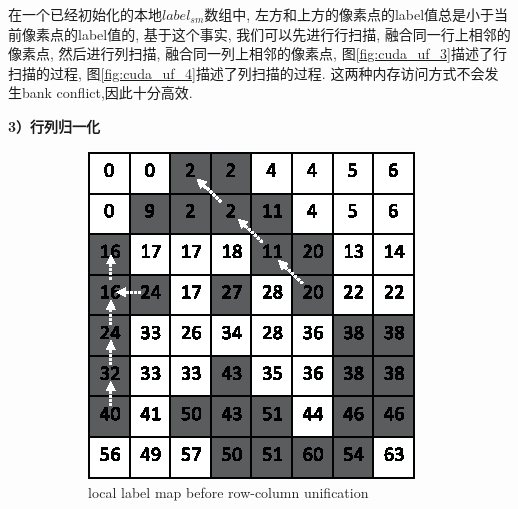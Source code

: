 \documentclass[a4paper, 11pt]{article}
\begin{document}
在一个已经初始化的本地$label_{sm}$数组中, 左方和上方的像素点的label值总是小于当前像素点的label值的, 基于这个事实, 我们可以先进行行扫描, 融合同一行上相邻的像素点, 然后进行列扫描, 融合同一列上相邻的像素点, 图\ref{fig:cuda_uf_3}描述了行扫描的过程, 图\ref{fig:cuda_uf_4}描述了列扫描的过程. 这两种内存访问方式不会发生bank conflict,因此十分高效.

\textbf{3）行列归一化}
\begin{figure}[H]
	\centering
	\begin{subfigure}[b]{0.3\textwidth}
		\centering
		\includegraphics[width=\textwidth]{images/cuda_uf/uf_5.eps}
		\caption{local label map before row-column unification}
		\label{fig:cuda_uf_5}
	\end{subfigure}
	\hspace{5mm} 
	\begin{subfigure}[b]{0.3\textwidth}
		\centering

\end{subfigure}
\end{figure}
\end{document}
